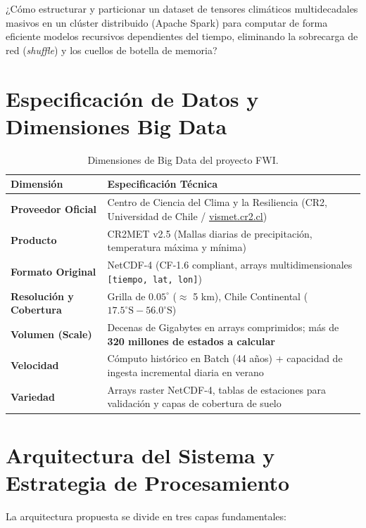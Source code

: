 \documentclass[11pt,a4paper]{article}
\begin{document}
\begin{alertbox}
¿Cómo estructurar y particionar un dataset de tensores climáticos multidecadales masivos en un clúster distribuido (Apache Spark) para computar de forma eficiente modelos recursivos dependientes del tiempo, eliminando la sobrecarga de red (\textit{shuffle}) y los cuellos de botella de memoria?
\end{alertbox}

\section{Especificación de Datos y Dimensiones Big Data}

\begin{table}[h!]
\centering
\small
\begin{tabularx}{\textwidth}{lX}
\toprule
\textbf{Dimensión} & \textbf{Especificación Técnica} \\
\midrule
\textbf{Proveedor Oficial} & Centro de Ciencia del Clima y la Resiliencia (CR2, Universidad de Chile / \url{vismet.cr2.cl}) \\
\textbf{Producto} & CR2MET v2.5 (Mallas diarias de precipitación, temperatura máxima y mínima) \\
\textbf{Formato Original} & NetCDF-4 (CF-1.6 compliant, arrays multidimensionales \texttt{[tiempo, lat, lon]}) \\
\textbf{Resolución y Cobertura} & Grilla de $0.05^\circ$ ($\approx$ 5 km), Chile Continental ($17.5^\circ\text{S} - 56.0^\circ\text{S}$) \\
\textbf{Volumen (Scale)} & Decenas de Gigabytes en arrays comprimidos; más de \textbf{320 millones de estados a calcular} \\
\textbf{Velocidad} & Cómputo histórico en Batch (44 años) + capacidad de ingesta incremental diaria en verano \\
\textbf{Variedad} & Arrays raster NetCDF-4, tablas de estaciones para validación y capas de cobertura de suelo \\
\bottomrule
\end{tabularx}
\caption{Dimensiones de Big Data del proyecto FWI.}
\end{table}

\section{Arquitectura del Sistema y Estrategia de Procesamiento}

La arquitectura propuesta se divide en tres capas fundamentales:
\end{document}
